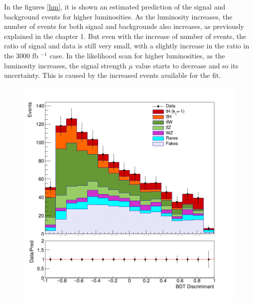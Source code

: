 \begin{linenumbers}
In the figures \ref{hm}, it is shown an estimated prediction of the signal and background events for higher luminosities. As the luminosity increases, the number of events for both signal and backgrounds also increases, as previously explained in the chapter 1. But even with the increase of number of events, the ratio of signal and data is still very small, with a slightly increase in the ratio in the 3000 fb $^{-1}$ case.  In the likelihood scan for higher luminosities, as the luminosity increases, the signal strength $\mu$ value starts to decrease and so its uncertainty. This is caused by the increased events available for the fit. \\



\begin{figure}[!htbp]
	\centering
	\begin{minipage}[b]{0.48\textwidth}
		\includegraphics[width=\textwidth]{Chapter4/kt-1/150fb/simple-150-kt-1.png}
	\end{minipage}
	\hfill
	\begin{minipage}[b]{0.48\textwidth}

\end{minipage}
\end{figure}
\end{linenumbers}

